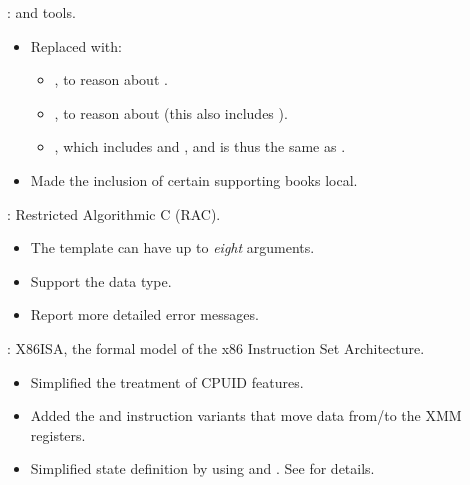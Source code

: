 
\begin{frame}

\implibtitle

:
 and  tools.
\begin{itemize}
\item Replaced  with:
      \begin{itemize}
      \item {}, to reason about .
      \item {}, to reason about 
            (this also includes ).
      \item {},
            which includes  and ,
            and is thus the same as .
      \end{itemize}
\item Made the inclusion of certain supporting books local.
\end{itemize}

\end{frame}


\begin{frame}

\implibtitle

:
Restricted Algorithmic C (RAC).
\begin{itemize}
\item The  template can have up to {\em eight} arguments.
\item Support the  data type.
\item Report more detailed error messages.
\end{itemize}

\end{frame}


\begin{frame}

\implibtitle

:
X86ISA, the formal model of the x86 Instruction Set Architecture.
\begin{itemize}
\item Simplified the treatment of CPUID features.
\item Added the  and  instruction variants
      that move data from/to the XMM registers.
\item Simplified state definition by using
       and . See
       for details.
\end{itemize}

\end{frame}

